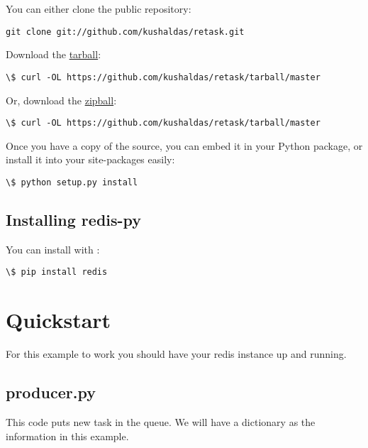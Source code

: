 \documentclass[letterpaper,10pt,english]{sphinxmanual}
\begin{document}
You can either clone the public repository:

\begin{Verbatim}[commandchars=\\\{\}]
git clone git://github.com/kushaldas/retask.git
\end{Verbatim}

Download the \href{https://github.com/kushaldas/retask/tarball/master}{tarball}:

\begin{Verbatim}[commandchars=\\\{\}]
\$ curl -OL https://github.com/kushaldas/retask/tarball/master
\end{Verbatim}

Or, download the \href{https://github.com/kushaldas/retask/zipball/master}{zipball}:

\begin{Verbatim}[commandchars=\\\{\}]
\$ curl -OL https://github.com/kushaldas/retask/tarball/master
\end{Verbatim}

Once you have a copy of the source, you can embed it in your Python package,
or install it into your site-packages easily:

\begin{Verbatim}[commandchars=\\\{\}]
\$ python setup.py install
\end{Verbatim}


\subsection{Installing redis-py}
\label{user/install:installing-redis-py}\label{user/install:redis}
You can install  with :

\begin{Verbatim}[commandchars=\\\{\}]
\$ pip install redis
\end{Verbatim}


\section{Quickstart}
\label{user/quickstart::doc}\label{user/quickstart:quickstart}\label{user/quickstart:id1}
For this example to work you should have your redis instance
up and running.


\subsection{producer.py}
\label{user/quickstart:producer-py}
This code puts new task in the queue. We will have a dictionary as
the information in this example.
\end{document}
